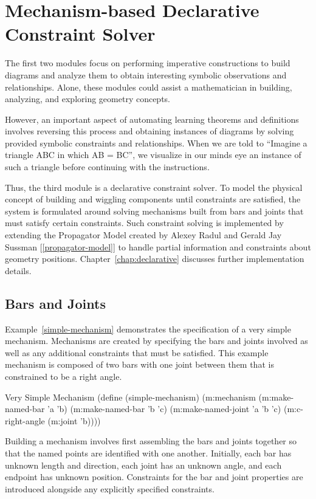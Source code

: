 \section{Mechanism-based Declarative Constraint Solver}

The first two modules focus on performing imperative constructions to
build diagrams and analyze them to obtain interesting symbolic
observations and relationships. Alone, these modules could assist a
mathematician in building, analyzing, and exploring geometry
concepts.

However, an important aspect of automating learning theorems and
definitions involves reversing this process and obtaining instances of
diagrams by solving provided symbolic constraints and
relationships. When we are told to ``Imagine a triangle ABC in which
AB = BC'', we visualize in our minds eye an instance of such a
triangle before continuing with the instructions.

Thus, the third module is a declarative constraint solver. To model
the physical concept of building and wiggling components until
constraints are satisfied, the system is formulated around solving
mechanisms built from bars and joints that must satisfy certain
constraints. Such constraint solving is implemented by extending the
Propagator Model created by Alexey Radul and Gerald Jay Sussman
[\ref{propagator-model}] to handle partial information and constraints
about geometry positions. Chapter~\ref{chap:declarative} discusses
further implementation details.

\subsection{Bars and Joints}

Example~\ref{simple-mechanism} demonstrates the specification of a
very simple mechanism. Mechanisms are created by specifying the bars
and joints involved as well as any additional constraints that must be
satisfied. This example mechanism is composed of two bars with one
joint between them that is constrained to be a right angle.

\begin{code-example}
[label=simple-mechanism]
{Very Simple Mechanism}
(define (simple-mechanism)
  (m:mechanism
   (m:make-named-bar 'a 'b)
   (m:make-named-bar 'b 'c)
   (m:make-named-joint 'a 'b 'c)
   (m:c-right-angle (m:joint 'b))))
\end{code-example}

Building a mechanism involves first assembling the bars and joints
together so that the named points are identified with one
another. Initially, each bar has unknown length and direction, each
joint has an unknown angle, and each endpoint has unknown
position. Constraints for the bar and joint properties are introduced
alongside any explicitly specified constraints.

